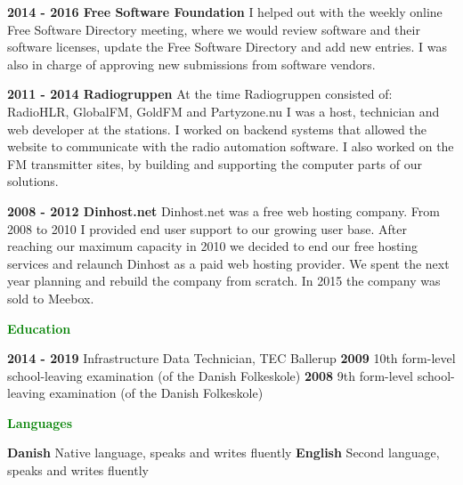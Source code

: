 \documentclass[11pt]{article}
\begin{document}
\textbf{2014 - 2016   Free Software Foundation}\newline
I helped out with the weekly online Free Software Directory meeting, where we would review software and their
software licenses, update the Free Software Directory and add new entries. I was also in charge of approving new
submissions from software vendors.\newline

\textbf{2011 - 2014   Radiogruppen}\newline
At the time Radiogruppen consisted of: RadioHLR, GlobalFM, GoldFM and Partyzone.nu I was a host, technician and
web developer at the stations. I worked on backend systems that allowed the website to communicate with the
radio automation software. I also worked on the FM transmitter sites, by building and supporting the computer
parts of our solutions.\newline

\textbf{2008 - 2012   Dinhost.net}\newline
Dinhost.net was a free web hosting company. From 2008 to 2010 I provided end user support to our growing user
base. After reaching our maximum capacity in 2010 we decided to end our free hosting services and relaunch
Dinhost as a paid web hosting provider. We spent the next year planning and rebuild the company from scratch. In
2015 the company was sold to Meebox.\newline

\textcolor{green}{{\fontsize{13}{16}\textbf{{Education}}}}\newline

\textbf{2014 - 2019}   Infrastructure Data Technician, TEC Ballerup\newline
\textbf{2009}          10th form-level school-leaving examination (of the Danish Folkeskole)\newline
\textbf{2008}          9th form-level school-leaving examination (of the Danish Folkeskole)\newline

\textcolor{green}{{\fontsize{13}{16}\textbf{{Languages}}}}\newline

\textbf{Danish}        Native language, speaks and writes fluently\newline
\textbf{English}       Second language, speaks and writes fluently\newline
\end{document}

